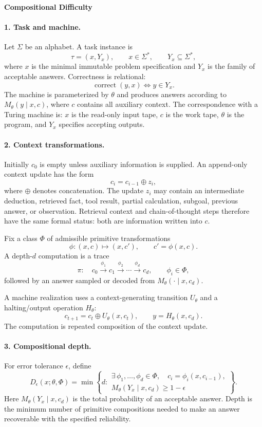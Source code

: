 \documentclass[11pt]{article}
\begin{document}
\begin{center}
    \textbf{Compositional Difficulty}
\end{center}

\paragraph{1. Task and machine.}
Let $\Sigma$ be an alphabet. A task instance is
\[
\tau=(x,Y_x),\qquad x\in\Sigma^*,\qquad Y_x\subseteq\Sigma^*,
\]
where $x$ is the minimal immutable problem specification and $Y_x$
is the family of acceptable answers. Correctness is relational:
\[
\operatorname{correct}(y,x)\iff y\in Y_x.
\]
The machine is parameterized by $\theta$ and produces answers according to
$M_\theta(y\mid x,c)$, where $c$ contains all auxiliary context.
The correspondence with a Turing machine is: $x$ is the read-only input
tape, $c$ is the work tape, $\theta$ is the program, and $Y_x$ specifies
accepting outputs.

\paragraph{2. Context transformations.}
Initially $c_0$ is empty unless auxiliary information is supplied.
An append-only context update has the form
\[
c_i=c_{i-1}\oplus z_i,
\]
where $\oplus$ denotes concatenation. The update $z_i$ may contain an
intermediate deduction, retrieved fact, tool result, partial calculation,
subgoal, previous answer, or observation. Retrieval context and
chain-of-thought steps therefore have the same formal status: both are
information written into $c$.

Fix a class $\Phi$ of admissible primitive transformations
\[
\phi:(x,c)\mapsto(x,c'),\qquad c'=\phi(x,c).
\]
A depth-$d$ computation is a trace
\[
\pi:\quad
c_0\xrightarrow{\phi_1}c_1
\xrightarrow{\phi_2}\cdots
\xrightarrow{\phi_d}c_d,
\qquad \phi_i\in\Phi,
\]
followed by an answer sampled or decoded from
$M_\theta(\cdot\mid x,c_d)$.

A machine realization uses a context-generating transition $U_\theta$
and a halting/output operation $H_\theta$:
\[
c_{t+1}=c_t\oplus U_\theta(x,c_t),
\qquad
y=H_\theta(x,c_d).
\]
The computation is repeated composition of the context update.

\paragraph{3. Compositional depth.}
For error tolerance $\epsilon$, define
\[
D_\epsilon(x;\theta,\Phi)
=
\min\left\{
d:
\begin{array}{l}
\exists\,\phi_1,\ldots,\phi_d\in\Phi,\quad
c_i=\phi_i(x,c_{i-1}),\\
M_\theta(Y_x\mid x,c_d)\geq 1-\epsilon
\end{array}
\right\}.
\]
Here $M_\theta(Y_x\mid x,c_d)$ is the total probability of an acceptable
answer. Depth is the minimum number of primitive compositions needed
to make an answer recoverable with the specified reliability.
\end{document}
